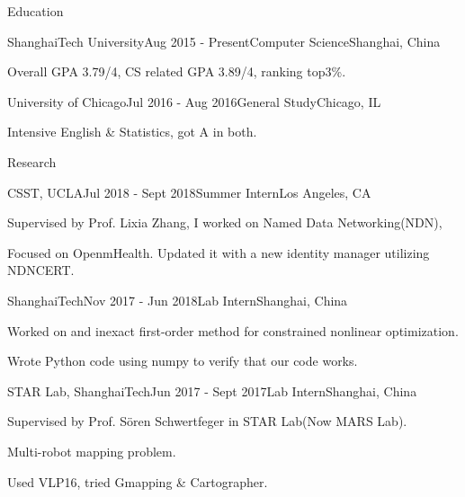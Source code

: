 \documentclass{resume} %
\begin{document}

\begin{rSection}{Education}

\begin{rSubsection}
  {ShanghaiTech University}{Aug 2015 - Present}{Computer Science}{Shanghai, China}
    \item Overall GPA 3.79/4, CS related GPA 3.89/4, ranking top3\%.
\end{rSubsection}


\begin{rSubsection}
  {University of Chicago}{Jul 2016 - Aug 2016}{General Study}{Chicago, IL}
    \item Intensive English \& Statistics, got A in both.
\end{rSubsection}
\end{rSection}

\begin{rSection}{Research}

\begin{rSubsection}
  {CSST, UCLA}{Jul 2018 - Sept 2018}{Summer Intern}{Los Angeles, CA}
    \item Supervised by Prof. Lixia Zhang, I worked on Named Data Networking(NDN), 
    \item Focused on OpenmHealth. Updated it with a new identity manager utilizing NDNCERT.
\end{rSubsection}


\begin{rSubsection}
  {ShanghaiTech}{Nov 2017 - Jun 2018}{Lab Intern}{Shanghai, China}
    \item Worked on and inexact first-order method for constrained nonlinear optimization.
    \item Wrote Python code using numpy to verify that our code works.
\end{rSubsection}


\begin{rSubsection}
  {STAR Lab, ShanghaiTech}{Jun 2017 - Sept 2017}{Lab Intern}{Shanghai, China}
    \item Supervised by Prof. Sören Schwertfeger in STAR Lab(Now MARS Lab).
    \item Multi-robot mapping problem.
    \item Used VLP16, tried Gmapping \& Cartographer.
\end{rSubsection}

\end{rSection}
\end{document}
